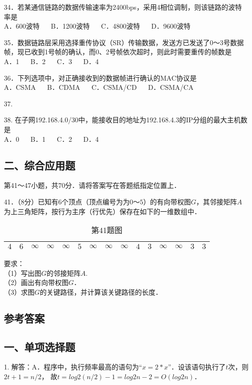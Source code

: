 34．若某通信链路的数据传输速率为2400bps，采用4相位调制，则该链路的波特率是 \\
A．600波特 $\quad$ B．1200波特 $\quad$ C．4800波特 $\quad$ D．9600波特

35．数据链路层采用选择重传协议（SR）传输数据，发送方已发送了0～3号数据帧，现已收到1号帧的确认，而0、2号帧依次超时，则此时需要重传的帧数是 \\
A．1 $\quad$ B．2 $\quad$ C．3 $\quad$ D．4

36．下列选项中，对正确接收到的数据帧进行确认的MAC协议是 \\
A．CSMA $\quad$ B．CDMA $\quad$ C．CSMA/CD $\quad$ D．CSMA/CA

37. 

38. 在子网192.168.4.0/30中，能接收目的地址为192.168.4.3的IP分组的最大主机数是 \\
A．0 $\quad$ B．1 $\quad$ C．2 $\quad$ D．4






\subsection{二、综合应用题}
第41～47小题，共70分．请将答案写在答题纸指定位置上．

41．（8分）已知有$6$个顶点（顶点编号为为$0$～$5$）的有向带权图$G$，其邻接矩阵$A$为上三角矩阵，按行为主序（行优先）保存在如下的一维数组中．
\begin{table}[ht]
\centering
\caption{第41题图}\label{Na11_tab1}
\begin{tabular}{|c|c|c|c|c|c|c|c|c|c|c|c|c|c|c|}
\hline
$4$ & $6$ & $\infty$ & $\infty$ & $\infty$ & $5$ & $\infty$ & $\infty$ & $\infty$ & $4$ & $3$ & $\infty$ & $\infty$ & $3$ & $3$ \\
\hline
\end{tabular}
\end{table}
要求：  \\
（1）写出图$G$的邻接矩阵$A$.  \\
（2）画出有向带权图$G$．  \\
（3）求图$G$的关键路径，并计算该关键路径的长度．




\subsection{参考答案}
\subsection{一、单项选择题}
1. 解答：A．程序中，执行频率最高的语句为“$x=2*x$”．设该语句执行了$t$次，则$2t+1=n/2$， 故$t=log2(n/2)-1=log2n-2= O(log2n)$．


